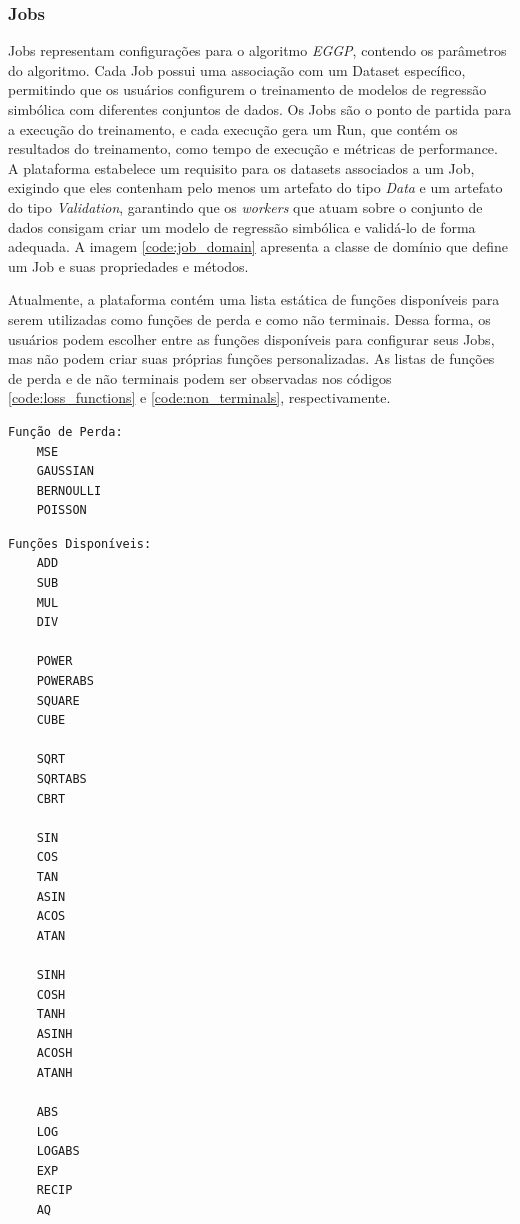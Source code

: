 \subsubsection{Jobs}
Jobs representam configurações para o algoritmo \textit{EGGP}, contendo os parâmetros do algoritmo. Cada Job possui uma associação com um Dataset específico, permitindo que os usuários configurem o treinamento de modelos de regressão simbólica com diferentes conjuntos de dados. Os Jobs são o ponto de partida para a execução do treinamento, e cada execução gera um Run, que contém os resultados do treinamento, como tempo de execução e métricas de performance. A plataforma estabelece um requisito para os datasets associados a um Job, exigindo que eles contenham pelo menos um artefato do tipo \textit{Data} e um artefato do tipo \textit{Validation}, garantindo que os \textit{workers} que atuam sobre o conjunto de dados consigam criar um modelo de regressão simbólica e validá-lo de forma adequada. A imagem \ref{code:job_domain} apresenta a classe de domínio que define um Job e suas propriedades e métodos.

Atualmente, a plataforma contém uma lista estática de funções disponíveis para serem utilizadas como funções de perda e como não terminais. Dessa forma, os usuários podem escolher entre as funções disponíveis para configurar seus Jobs, mas não podem criar suas próprias funções personalizadas. As listas de funções de perda e de não terminais podem ser observadas nos códigos \ref{code:loss_functions} e \ref{code:non_terminals}, respectivamente.
\begin{lstlisting}[language=Python, caption={Lista de funções de perda disponíveis}, label={code:loss_functions}]
Função de Perda:
    MSE
    GAUSSIAN
    BERNOULLI
    POISSON
\end{lstlisting}

\begin{lstlisting}[language=Python, caption={Lista de não terminais disponíveis}, label={code:non_terminals}]
Funções Disponíveis:
    ADD
    SUB
    MUL
    DIV

    POWER
    POWERABS
    SQUARE
    CUBE

    SQRT
    SQRTABS
    CBRT

    SIN
    COS
    TAN
    ASIN
    ACOS
    ATAN

    SINH
    COSH
    TANH
    ASINH
    ACOSH
    ATANH

    ABS
    LOG
    LOGABS
    EXP
    RECIP
    AQ
\end{lstlisting}

